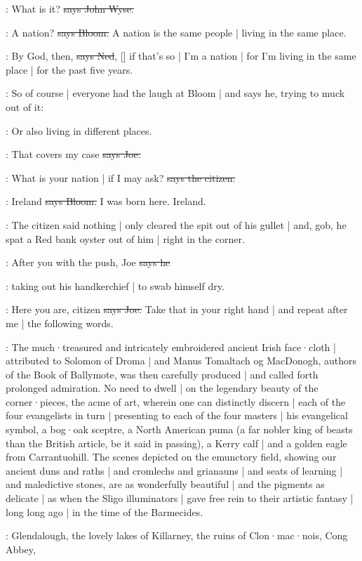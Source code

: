 \johnwyse:
What is it?
\sout{says John Wyse.}

\Bloom:
A nation?
\sout{says Bloom.}
A nation is the same people |
living in the same place.

\lambert:
By God,
then,
\sout{says Ned},
[]
if that's so |
I'm a nation |
for I'm living in the same place |
for the past five years.

\Nq:
So of course |
everyone had the laugh at Bloom |
and says he,
trying to muck out of it:

\Bloom:
Or also living in different places.

\joe:
That covers my case
\sout{says Joe.}

\citizen:
What is your nation |
if I may ask?
\sout{says the citizen.}

\Bloom:
Ireland
\sout{says Bloom.}
I was born here.
Ireland.

\Nq:
The citizen said nothing |
only cleared the spit out of his gullet |
and,
gob,
he spat a Red bank oyster out of him |
right in the corner.

\citizen:
After you with the push,
Joe
\sout{says he}

\Nq:
taking out his handkerchief |
to swab himself dry.

\joe:
Here you are,
citizen
\sout{says Joe.}
Take that in your right hand |
and repeat after me |
the following words.

:
The much·treasured and intricately embroidered ancient Irish face·cloth |
attributed to Solomon of Droma |
and Manus Tomaltach og MacDonogh,
authors of the Book of Ballymote,
was then carefully produced |
and called forth prolonged admiration.
No need to dwell |
on the legendary beauty of the corner·pieces,
the acme of art,
wherein one can distinctly discern |
each of the four evangelists in turn |
presenting to each of the four masters |
his evangelical symbol,
a bog·oak sceptre,
a North American puma
(a far nobler king of beasts than the British article,
be it said in passing),
a Kerry calf |
and a golden eagle from Carrantuohill.
The scenes depicted on the emunctory field,
showing our ancient duns and raths |
and cromlechs and grianauns |
and seats of learning |
and maledictive stones,
are as wonderfully beautiful |
and the pigments as delicate |
as when the Sligo illuminators |
gave free rein to their artistic fantasy
 |
long long ago |
in the time of the Barmecides.

:
Glendalough,
the lovely lakes of Killarney,
the ruins of Clon·mac·nois,
Cong Abbey,

